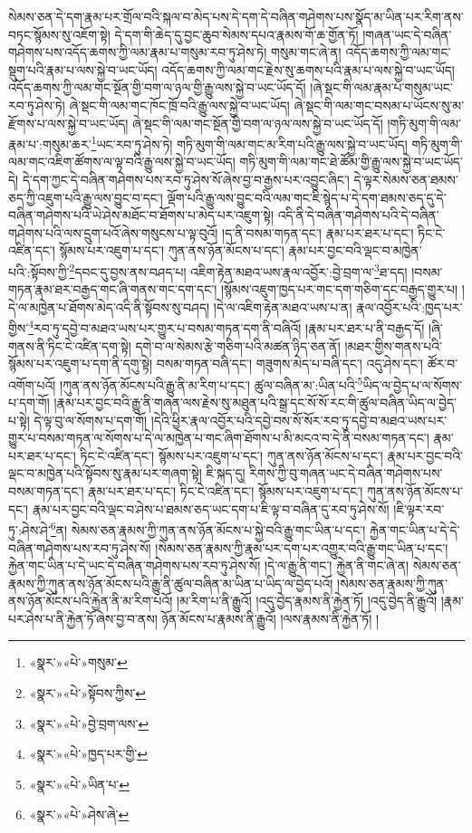 སེམས་ཅན་དེ་དག་རྣམ་པར་གྲོལ་བའི་སྐལ་བ་མེད་པས་དེ་དག་དེ་བཞིན་གཤེགས་པས་སྣོད་མ་ཡིན་པར་རིག་ནས་བཏང་སྙོམས་སུ་འཇོག་སྟེ། དེ་དག་གི་ཆེད་དུ་བྱང་ཆུབ་སེམས་དཔའ་རྣམས་གོ་ཆ་གྱོན་ཏོ། །གཞན་ཡང་དེ་བཞིན་གཤེགས་པས་འདོད་ཆགས་ཀྱི་ལམ་རྣམ་པ་གསུམ་རབ་ཏུ་ཤེས་ཏེ། གསུམ་གང་ཞེ་ན། འདོད་ཆགས་ཀྱི་ལམ་གང་སྡུག་པའི་རྣམ་པ་ལས་སྐྱེ་བ་ཡང་ཡོད། འདོད་ཆགས་ཀྱི་ལམ་གང་རྗེས་སུ་ཆགས་པའི་རྣམ་པ་ལས་སྐྱེ་བ་ཡང་ཡོད། འདོད་ཆགས་ཀྱི་ལམ་གང་སྔོན་གྱི་བག་ལ་ཉལ་གྱི་རྒྱུ་ལས་སྐྱེ་བ་ཡང་ཡོད་དོ། །ཞེ་སྡང་གི་ལམ་རྣམ་པ་གསུམ་ཡང་རབ་ཏུ་ཤེས་ཏེ། ཞེ་སྡང་གི་ལམ་གང་ཁོང་ཁྲོ་བའི་རྒྱུ་ལས་སྐྱེ་བ་ཡང་ཡོད། ཞེ་སྡང་གི་ལམ་གང་བསམ་པ་ཡོངས་སུ་མ་རྫོགས་པ་ལས་སྐྱེ་བ་ཡང་ཡོད། ཞེ་སྡང་གི་ལམ་གང་སྔོན་གྱི་བག་ལ་ཉལ་ལས་སྐྱེ་བ་ཡང་ཡོད་དོ། །གཏི་མུག་གི་ལམ་རྣམ་པ་:གསུམ་ཆར་\footnote{«སྣར་»«པེ་»གསུམ་}ཡང་རབ་ཏུ་ཤེས་ཏེ། གཏི་མུག་གི་ལམ་གང་མ་རིག་པའི་རྒྱུ་ལས་སྐྱེ་བ་ཡང་ཡོད། གཏི་མུག་གི་ལམ་གང་འཇིག་ཚོགས་ལ་ལྟ་བའི་རྒྱུ་ལས་སྐྱེ་བ་ཡང་ཡོད། གཏི་མུག་གི་ལམ་གང་ཐེ་ཚོམ་གྱི་རྒྱུ་ལས་སྐྱེ་བ་ཡང་ཡོད་དེ། དེ་དག་ཀྱང་དེ་བཞིན་གཤེགས་པས་རབ་ཏུ་ཤེས་སོ་ཞེས་བྱ་བ་རྒྱས་པར་འབྱུང་ཞིང་། དེ་ལྟར་སེམས་ཅན་ཐམས་ཅད་ཀྱི་འཇུག་པའི་རྒྱུ་ལས་བྱུང་བ་དང་། ལྡོག་པའི་རྒྱུ་ལས་བྱུང་བའི་ལམ་གང་ཇི་སྙེད་པ་དེ་དག་ཐམས་ཅད་དུ་དེ་བཞིན་གཤེགས་པའི་ཡེ་ཤེས་མཐོང་བ་ཐོགས་པ་མེད་པར་འཇུག་སྟེ། འདི་ནི་དེ་བཞིན་གཤེགས་པའི་དེ་བཞིན་གཤེགས་པའི་ལས་དྲུག་པའོ་ཞེས་གསུངས་པ་ལྟ་བུའོ། །ད་ནི་བསམ་གཏན་དང་། རྣམ་པར་ཐར་པ་དང་། ཏིང་ངེ་འཛིན་དང་། སྙོམས་པར་འཇུག་པ་དང་། ཀུན་ནས་ཉོན་མོངས་པ་དང་། རྣམ་པར་བྱང་བའི་ལྡང་བ་མཁྱེན་པའི་:སྟོབས་ཀྱི་\footnote{«སྣར་»«པེ་»སྟོབས་ཀྱིས་}དབང་དུ་བྱས་ནས་བཤད་པ། འཇིག་རྟེན་མཐའ་ཡས་རྣལ་འབྱོར་:བྱེ་བྲག་ལ་\footnote{«སྣར་»«པེ་»བྱེ་བྲག་ལས་}ཐ་དད། །བསམ་གཏན་རྣམ་ཐར་བརྒྱད་གང་ཞི་གནས་གང་དག་དང་། །སྙོམས་འཇུག་ཁྱད་པར་གང་དག་གཅིག་དང་བརྒྱད་གྱུར་པ། །དེ་ལ་མཁྱེན་པ་ཐོགས་མེད་འདི་ནི་སྟོབས་སུ་བཤད། །དེ་ལ་འཇིག་རྟེན་མཐའ་ཡས་པ་ན། རྣལ་འབྱོར་པའི་:ཁྱད་པར་གྱིས་\footnote{«སྣར་»«པེ་»ཁྱད་པར་གྱི་}རབ་ཏུ་དབྱེ་བ་མཐའ་ཡས་པར་གྱུར་པ་བསམ་གཏན་དག་ནི་བཞིའོ། །རྣམ་པར་ཐར་པ་ནི་བརྒྱད་དོ། །ཞི་གནས་ནི་ཏིང་ངེ་འཛིན་དག་སྟེ། དགེ་བ་ལ་སེམས་རྩེ་གཅིག་པའི་མཚན་ཉིད་ཅན་ནོ། །མཐར་གྱིས་གནས་པའི་སྙོམས་པར་འཇུག་པ་དག་ནི་དགུ་སྟེ། བསམ་གཏན་བཞི་དང་། གཟུགས་མེད་པ་བཞི་དང་། འདུ་ཤེས་དང་། ཚོར་བ་འགོག་པའོ། །ཀུན་ནས་ཉོན་མོངས་པའི་རྒྱུ་ནི་མ་རིག་པ་དང་། ཚུལ་བཞིན་མ་:ཡིན་པའི་\footnote{«སྣར་»«པེ་»ཡིན་པ་}ཡིད་ལ་བྱེད་པ་ལ་སོགས་པ་དག་གོ། །རྣམ་པར་བྱང་བའི་རྒྱུ་ནི་གཞན་ལས་རྗེས་སུ་མཐུན་པའི་སྒྲ་དང་སོ་སོ་རང་གི་ཚུལ་བཞིན་ཡིད་ལ་བྱེད་པ་སྟེ། དེ་ལྟ་བུ་ལ་སོགས་པ་དག་གོ། །དེའི་ཕྱིར་རྣལ་འབྱོར་པའི་དབྱེ་བས་སོ་སོར་རབ་ཏུ་དབྱེ་བ་མཐའ་ཡས་པར་གྱུར་པ་བསམ་གཏན་ལ་སོགས་པ་དེ་ལ་མཁྱེན་པ་གང་ཞིག་ཐོགས་པ་མི་མངའ་བ་དེ་ནི་བསམ་གཏན་དང་། རྣམ་པར་ཐར་པ་དང་། ཏིང་ངེ་འཛིན་དང་། སྙོམས་པར་འཇུག་པ་དང་། ཀུན་ནས་ཉོན་མོངས་པ་དང་། རྣམ་པར་བྱང་བའི་ལྡང་བ་མཁྱེན་པའི་སྟོབས་སུ་རྣམ་པར་གཞག་སྟེ། ཇི་སྐད་དུ། རིགས་ཀྱི་བུ་གཞན་ཡང་དེ་བཞིན་གཤེགས་པས་བསམ་གཏན་དང་། རྣམ་པར་ཐར་པ་དང་། ཏིང་ངེ་འཛིན་དང་། སྙོམས་པར་འཇུག་པ་དང་། ཀུན་ནས་ཉོན་མོངས་པ་དང་། རྣམ་པར་བྱང་བའི་ལྡང་བ་ཤེས་པ་ཐམས་ཅད་ཡང་དག་པ་ཇི་ལྟ་བ་བཞིན་དུ་རབ་ཏུ་ཤེས་སོ། །ཇི་ལྟར་རབ་ཏུ་:ཤེས་ཤེ་\footnote{«སྣར་»«པེ་»ཤེས་ཞེ་}ན། སེམས་ཅན་རྣམས་ཀྱི་ཀུན་ནས་ཉོན་མོངས་པ་སྐྱེ་བའི་རྒྱུ་གང་ཡིན་པ་དང་། རྐྱེན་གང་ཡིན་པ་དེ་དེ་བཞིན་གཤེགས་པས་རབ་ཏུ་ཤེས་སོ། །སེམས་ཅན་རྣམས་ཀྱི་རྣམ་པར་དག་པར་འགྱུར་བའི་རྒྱུ་གང་ཡིན་པ་དང་། རྐྱེན་གང་ཡིན་པ་དེ་ཡང་དེ་བཞིན་གཤེགས་པས་རབ་ཏུ་ཤེས་སོ། །དེ་ལ་རྒྱུ་ནི་གང་། རྐྱེན་ནི་གང་ཞེ་ན། སེམས་ཅན་རྣམས་ཀྱི་ཀུན་ནས་ཉོན་མོངས་པའི་རྒྱུ་ནི་ཚུལ་བཞིན་མ་ཡིན་པ་ཡིད་ལ་བྱེད་པའོ། །སེམས་ཅན་རྣམས་ཀྱི་ཀུན་ནས་ཉོན་མོངས་པའི་རྐྱེན་ནི་མ་རིག་པའོ། །མ་རིག་པ་ནི་རྒྱུའོ། །འདུ་བྱེད་རྣམས་ནི་རྐྱེན་ཏོ། །འདུ་བྱེད་ནི་རྒྱུའོ། །རྣམ་པར་ཤེས་པ་ནི་རྐྱེན་ཏོ་ཞེས་བྱ་བ་ནས། ཉོན་མོངས་པ་རྣམས་ནི་རྒྱུའོ། །ལས་རྣམས་ནི་རྐྱེན་ཏོ། །
